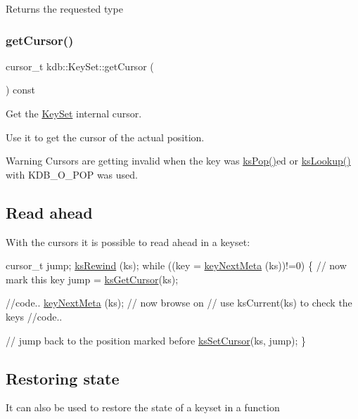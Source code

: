 \begin{DoxyReturn}{Returns}
the requested type 
\end{DoxyReturn}
\mbox{\label{classkdb_1_1KeySet_a6f93621c0baab89dfa122391e3117f34}} 
\subsubsection{\texorpdfstring{get\+Cursor()}{getCursor()}}
{\footnotesize\ttfamily cursor\+\_\+t kdb\+::\+Key\+Set\+::get\+Cursor (\begin{DoxyParamCaption}{ }\end{DoxyParamCaption}) const\hspace{0.3cm}{\ttfamily [inline]}}



Get the \hyperlink{classkdb_1_1KeySet}{Key\+Set} internal cursor. 

Use it to get the cursor of the actual position.

\begin{DoxyWarning}{Warning}
Cursors are getting invalid when the key was \hyperlink{group__keyset_gae42530b04defb772059de0600159cf69}{ks\+Pop()}ed or \hyperlink{group__keyset_gaa34fc43a081e6b01e4120daa6c112004}{ks\+Lookup()} with K\+D\+B\+\_\+\+O\+\_\+\+P\+OP was used.
\end{DoxyWarning}
\hypertarget{group__keyset_readahead}{}\subsection{Read ahead}\label{group__keyset_readahead}
With the cursors it is possible to read ahead in a keyset\+:


\begin{DoxyCode}
cursor\_t jump;
\hyperlink{group__keyset_gabe793ff51f1728e3429c84a8a9086b70}{ksRewind} (ks);
\textcolor{keywordflow}{while} ((key = \hyperlink{group__keymeta_ga4c88342f580a4291455a801af71ce048}{keyNextMeta} (ks))!=0)
\{
        \textcolor{comment}{// now mark this key}
        jump = \hyperlink{group__keyset_gaffe507ab9281c322eb16c3e992075d29}{ksGetCursor}(ks);

        \textcolor{comment}{//code..}
        \hyperlink{group__keymeta_ga4c88342f580a4291455a801af71ce048}{keyNextMeta} (ks); \textcolor{comment}{// now browse on}
        \textcolor{comment}{// use ksCurrent(ks) to check the keys}
        \textcolor{comment}{//code..}

        \textcolor{comment}{// jump back to the position marked before}
        \hyperlink{group__keyset_gad94c9ffaa3e8034564c0712fd407c345}{ksSetCursor}(ks, jump);
\}
\end{DoxyCode}
\hypertarget{group__keyset_restore}{}\subsection{Restoring state}\label{group__keyset_restore}
It can also be used to restore the state of a keyset in a function


